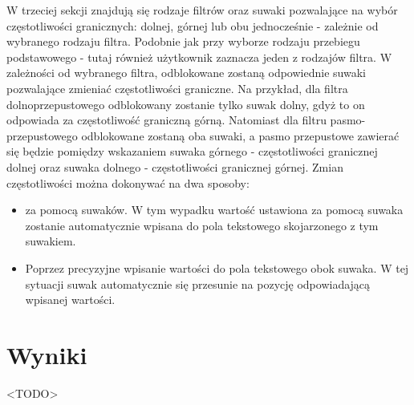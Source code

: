 W trzeciej sekcji znajdują się rodzaje filtrów oraz suwaki pozwalające na wybór częstotliwości granicznych: dolnej, górnej lub obu jednocześnie - zależnie od wybranego rodzaju filtra. Podobnie jak przy wyborze rodzaju przebiegu podstawowego - tutaj również użytkownik zaznacza jeden z rodzajów filtra. W zależności od wybranego filtra, odblokowane zostaną odpowiednie suwaki pozwalające zmieniać częstotliwości graniczne. Na przykład, dla filtra dolnoprzepustowego odblokowany zostanie tylko suwak dolny, gdyż to on odpowiada za częstotliwość graniczną górną. Natomiast dla filtru pasmo-przepustowego odblokowane zostaną oba suwaki, a pasmo przepustowe zawierać się będzie pomiędzy wskazaniem suwaka górnego - częstotliwości granicznej dolnej oraz suwaka dolnego - częstotliwości granicznej górnej.
Zmian częstotliwości można dokonywać na dwa sposoby:
\begin{itemize}
	\item za pomocą suwaków. W tym wypadku wartość ustawiona za pomocą suwaka zostanie automatycznie wpisana do pola tekstowego skojarzonego z tym suwakiem.
	\item Poprzez precyzyjne wpisanie wartości do pola tekstowego obok suwaka. W tej sytuacji suwak automatycznie się przesunie na pozycję odpowiadającą wpisanej wartości.
\end{itemize}

\section{Wyniki}
<TODO>
